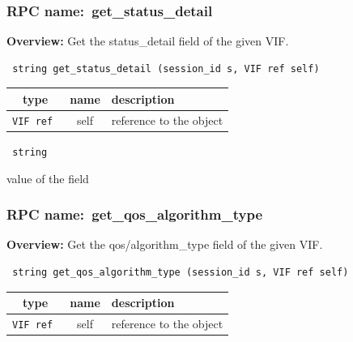 \subsubsection{RPC name:~get\_status\_detail}

{\bf Overview:} 
Get the status\_detail field of the given VIF.

\begin{verbatim} string get_status_detail (session_id s, VIF ref self)\end{verbatim}



 
\vspace{0.3cm}
\begin{tabular}{|c|c|p{7cm}|}
 \hline
{\bf type} & {\bf name} & {\bf description} \\ \hline
{\tt VIF ref } & self & reference to the object \\ \hline 

\end{tabular}

\vspace{0.3cm}

{\tt 
string
}


value of the field
\vspace{0.3cm}
\vspace{0.3cm}
\vspace{0.3cm}
\subsubsection{RPC name:~get\_qos\_algorithm\_type}

{\bf Overview:} 
Get the qos/algorithm\_type field of the given VIF.

\begin{verbatim} string get_qos_algorithm_type (session_id s, VIF ref self)\end{verbatim}



 
\vspace{0.3cm}
\begin{tabular}{|c|c|p{7cm}|}
 \hline
{\bf type} & {\bf name} & {\bf description} \\ \hline
{\tt VIF ref } & self & reference to the object \\ \hline 

\end{tabular}

